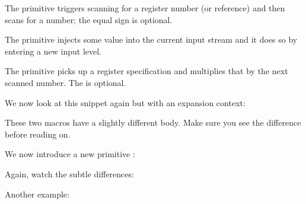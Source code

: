 \startitem
    The  primitive triggers scanning for a register number (or
    reference) and then scans for a number; the equal sign is optional.
\stopitem

\startitem
    The  primitive injects some value into the current input stream
    and it does so by entering a new input level.
\stopitem

\startitem
    The  primitive picks up a register specification and
    multiplies that by the next scanned number. The  is optional.
\stopitem

\stopitemize

We now look at this snippet again but with an expansion context:

\startbuffer[def]
\stopbuffer

\startbuffer[edef]
\edef{}
\stopbuffer

\typebuffer[def] [option=TEX]
\typebuffer[edef][option=TEX]

\getbuffer[def]
\getbuffer[edef]

These two macros have a slightly different body. Make sure you see the
difference before reading on.

\luatokentable\TestA

\luatokentable\TestB

We now introduce a new primitive \type {\localcontrolled}:

\startbuffer[edef]
\edef{}
\stopbuffer

\startbuffer[ldef]
\edef{}
\stopbuffer

\typebuffer[edef][option=TEX]
\typebuffer[ldef][option=TEX]

\getbuffer[edef]
\getbuffer[ldef]

Again, watch the subtle differences:

\luatokentable\TestB

\luatokentable\TestC

Another example:

\startbuffer[edef]
\edef{}
\stopbuffer

\startbuffer[ldef]
\edef{}
\stopbuffer

\typebuffer[edef][option=TEX]
\typebuffer[ldef][option=TEX]


